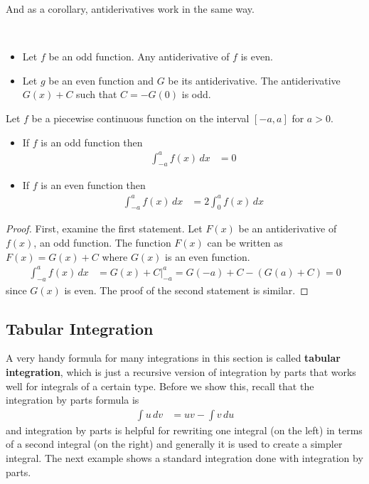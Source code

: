 And as a corollary, antiderivatives work in the same way.  



\begin{corollary}
~
\begin{itemize}
\item Let $f$ be an odd function.  Any antiderivative of $f$ is even.  
\item Let $g$ be an even function and $G$ be its antiderivative.  The antiderivative $G(x)+C$ such that $C=-G(0)$ is odd.  
\end{itemize}

\end{corollary}



\begin{theorem} Let $f$ be a piecewise continuous function on the interval $[-a,a]$ for $a>0$.  

\begin{itemize}
\item If $f$ is an odd function then 
% 
\begin{align*}
\int_{-a}^a f(x) \, dx & = 0 
\end{align*}
\item If $f$ is an even function then 
% 
\begin{align*}
\int_{-a}^a f(x) \, dx & = 2 \int_{0}^a f(x) \, dx 
\end{align*}
\end{itemize}
\end{theorem}

\begin{proof}
First, examine the first statement.  Let $F(x)$ be an antiderivative of $f(x)$, an odd function.  The function $F(x)$ can be written as $F(x)=G(x)+C$ where $G(x)$ is an even function. 
% 
\begin{align}
\int_{-a}^a f(x) \,dx & = G(x) + C \biggl\vert_{-a}^a = G(-a)+C - (G(a)+C) = 0 
\end{align}
since $G(x)$ is even.   The proof of the second statement is similar.  
\end{proof}





\subsection{Tabular Integration}

A very handy formula for many integrations in this section is called \textbf{tabular integration}, which is just a recursive version of integration by parts that works well for integrals of a certain type.  Before we show this, recall that the integration by parts formula is
%
\begin{align*}
\int u \, dv & = uv - \int v \, du
\end{align*}
and integration by parts is helpful for rewriting one integral (on the left) in terms of a second integral (on the right) and generally it is used to create a simpler integral. The next example shows a standard integration done with integration by parts. 

